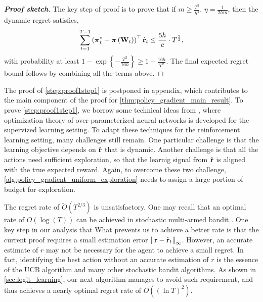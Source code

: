 \begin{proof}[\bf Proof sketch]
The key step of proof is to prove that if $m \ge \frac{T^2}{h^2}$, $\eta = \frac{1}{2 h m}$, then the dynamic regret satisfies,
\begin{equation}
\label{step:proof1step1}
\begin{split}
\sum\limits_{t=1}^{T-1}{ \left(  {{\boldsymbol{\pi}}_t^*} - {\boldsymbol{\pi}}\left( {\mathbf{W}}_t \right) \right)^\top \hat{{\mathbf{r}}}_t } \le \frac{5 h}{c} \cdot  T^{\frac{2}{3}},
\end{split}
\end{equation}
with probability at least $1 - \exp\left\{ - \frac{T^2}{16 h} \right\} \ge 1 - \frac{16 h}{T^2}$.
The final expected regret bound follows by combining all the terms above. 	
\end{proof}

\begin{remk}
	The proof of \cref{step:proof1step1} is postponed in appendix, which contributes to the main component of the proof for \cref{thm:policy_gradient_main_result}.
	To prove \cref{step:proof1step1}, we borrow some technical ideas from \cite{li2018learning,allen2018convergenceB},  where optimization theory of over-parameterized neural networks is developed for the supervized learning setting. To adapt these techniques for the reinforcement learning setting, many challenges still remain. One particular challenge is that the learning objective depends on $\hat{{\mathbf{r}}}$ that is dynamic. Another challenge is that all the actions need sufficient exploration, so that the learnig signal from $\hat{{\mathbf{r}}}$ is aligned with the true expected reward. Again, to overcome these two challenge, \cref{alg:policy_gradient_uniform_exploration} needs to assign a large portion of budget for exploration.
\end{remk}

\begin{remk}
The regret rate of $\tilde{O}(T^{2/3})$ is unsatisfactory. 
One may recall that an optimal rate of $O(\log(T))$ can be achieved in stochastic multi-armed bandit \citep{bubeck2012regret}. 
One key step in our analysis that 
What prevents us to achieve a better rate is that the current proof requires a small estimation error $\left\| {\mathbf{r}} - \hat{{\mathbf{r}}}_t \right\|_\infty$.
However, an accurate estimate of $r$ may not be necessary for the agent to achieve a small regret. 
In fact, identifying the best action without an accurate estimation of $r$ is the essence of the UCB algorithm and many other stochastic bandit algorithms. 
As shown in \cref{sec:logit_learning}, our next algorithm manages to avoid such requirement, and thus achieves a nearly optimal regret rate of $O((\ln T)^2)$.
\end{remk}

